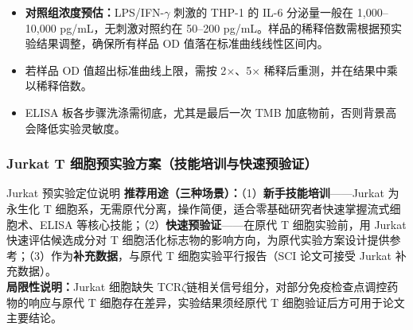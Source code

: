 \documentclass[12pt,a4paper,twoside]{article}
\begin{document}
\begin{warningbox}
\begin{itemize}
  \item \textbf{对照组浓度预估：}LPS/IFN-$\gamma$ 刺激的 THP-1 的 IL-6 分泌量一般在 1,000--10,000 pg/mL，无刺激对照约在 50--200 pg/mL。样品的稀释倍数需根据预实验结果调整，确保所有样品 OD 值落在标准曲线线性区间内。
  \item 若样品 OD 值超出标准曲线上限，需按 2$\times$、5$\times$ 稀释后重测，并在结果中乘以稀释倍数。
  \item ELISA 板各步骤洗涤需彻底，尤其是最后一次 TMB 加底物前，否则背景高会降低实验灵敏度。
\end{itemize}
\end{warningbox}

\subsubsection{Jurkat T 细胞预实验方案（技能培训与快速预验证）}
\label{sec:jurkat_preexp}

\begin{infobox}{Jurkat 预实验定位说明}
\textbf{推荐用途（三种场景）：}（1）\textbf{新手技能培训}——Jurkat 为永生化 T 细胞系，无需原代分离，操作简便，适合零基础研究者快速掌握流式细胞术、ELISA 等核心技能；（2）\textbf{快速预验证}——在原代 T 细胞实验前，用 Jurkat 快速评估候选成分对 T 细胞活化标志物的影响方向，为原代实验方案设计提供参考；（3）作为\textbf{补充数据}，与原代 T 细胞实验平行报告（SCI 论文可接受 Jurkat 补充数据）。\\
\textbf{局限性说明：}Jurkat 细胞缺失 TCR$\zeta$链相关信号组分，对部分免疫检查点调控药物的响应与原代 T 细胞存在差异，实验结果须经原代 T 细胞验证后方可用于论文主要结论。
\end{infobox}
\end{document}
